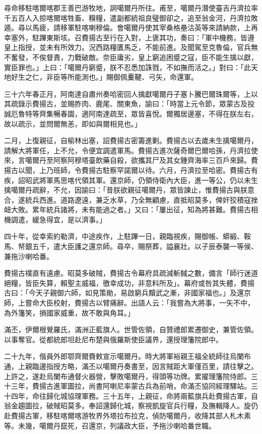 \begin{pinyinscope}
尋命移駐喀爾喀郡王善巴游牧地，詗噶爾丹所往。甫至，噶爾丹潛使臺吉丹濟拉率千五百人入掠喀爾喀牲畜、糗糧，遣副都統祖良璧御卻之，追至翁金河，丹濟拉敗遁。尋以馬疲，請移軍駐喀喇穆倫。會噶爾丹使其宰桑格壘沽英等來請納款，上再幸塞外，駐蹕東斯垓。召費揚古至行在入對，上褒其功，奏曰：「軍中機務，皆遵皇上指授，並未有所效力。況西路糧匱馬乏，不能前進。及聞駕至克魯倫，官兵無不奮發，不俟督責，力戰破敵。奈臣庸劣，皇上窮追困蹙之寇，臣不能生擒以獻，實臣罪也。」上曰：「噶爾丹窮蹙，朕不忍悉加誅戮，不如撫而活之。」對曰：「此天地好生之仁，非臣等所能測也。」賜御佩櫜鞬、弓矢，命還軍。

三十六年春正月，阿南達自肅州奏哈密回人擒獻噶爾丹子塞卜騰巴爾珠爾等，上以其疏錄示費揚古，並賜胙肉、鹿尾、關東魚，諭曰：「時當上元令節，眾蒙古及投誠厄魯特等齊集暢春園，適阿南達疏至，眾皆喜悅。爾獨居邊塞，不得在朕左右，故以疏示，並問爾無恙，即如與爾相見也。」

二月，上復親征，自榆林出塞，詔費揚古密籌進剿。費揚古以去歲未生擒噶爾丹，請解大將軍任，上不允，令便宜調遣軍馬。費揚古進次薩奇爾巴爾哈孫，丹濟拉使來，言噶爾丹至阿察阿穆塔臺飲藥自殺，欲攜其尸及其女鍾齊海率三百戶來歸。費揚古以聞，上乃班師，令費揚古駐察罕諾爾以待。六月，丹濟拉至哈密。費揚古有疾，詔昭武將軍馬思喀代領其軍。還京師，仍領侍衛內大臣，進一等公，仍以未生擒噶爾丹疏辭，不允，因諭曰：「昔朕欲親征噶爾丹，眾皆諫止，惟費揚古與朕意合，遂統兵西進。道路遼遠，兼乏水草，乃全無顧慮，直抵昭莫多，俾奸狡積寇挫衄大敗。累年統兵諸將，未有能過之者。」又曰：「屢出征，知為將甚難。費揚古相機調遣，緩急得宜，是以濟事。」

四十年，從幸索約勒濟，中途疾作，上駐蹕一日，親臨視疾，賜御帳、蟒緞、鞍馬、帑銀五千，遣大臣護之還京師。尋卒，賜祭葬，謚襄壯。以子辰泰襲一等侯、兼拖沙喇哈番。

費揚古樸直有遠慮。昭莫多破賊，費揚古令幕府具疏減斬馘之數，備言「師行迷道絕糧，皆臣失算，賴聖主威福，徼幸成功，非意料所及」。幕府或咎其失體，費揚古曰：「今天子親御六師，如見策勛，易啟窮兵黷武之漸，非國家福也。」及還京師，上嘗命大臣校射，費揚古以臂痛辭。出語人云：「我嘗為大將事，一矢不中，為外籓笑，損國家威重，故不敢與角耳。」

滿丕，伊爾根覺羅氏，滿洲正藍旗人。世管佐領，自贊禮郎累遷御史，兼管佐領。以事奪官。從都統郎坦赴尼布楚與俄羅斯使臣議界，還授理籓院郎中。

二十九年，偕員外郎鄂齊爾賚敕宣示噶爾丹。時大將軍裕親王福全統師往烏闌布通，上親臨邊指授方略，滿丕以噶爾丹奏書至，因言賊距大軍僅百里，請往擊之。上許之，遂赴烏闌布通督火器營，擊敗噶爾丹，得頭等功牌。累擢理籓院侍郎。三十三年，費揚古進軍圖拉，尚書阿喇尼率蒙古兵為前哨，命滿丕協同經理驛站。三十四年，命往歸化城協理軍務。三十五年，上親征，命將兩藍旗兵赴費揚古軍，自翁金趨圖拉，破賊昭莫多。奉詔還歸化城，察視凱旋官兵行糧，及撫輯降人。旋仍赴費揚古軍，移駐喀爾喀游牧界外塔拉布拉克，偵防噶爾丹，收降其部人札木素等。未幾，噶爾丹竄死，召還京，列議政大臣，予拖沙喇哈番世職。


\end{pinyinscope}

